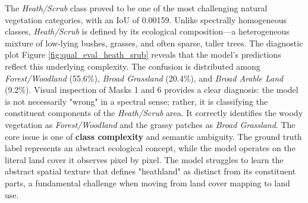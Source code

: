 \documentclass{report}
\begin{document}
\par
The \textit{Heath/Scrub} class proved to be one of the most challenging natural vegetation categories, with an IoU of 0.00159. Unlike spectrally homogeneous classes, \textit{Heath/Scrub} is defined by its ecological composition—a heterogeneous mixture of low-lying bushes, grasses, and often sparse, taller trees.
The diagnostic plot Figure \ref{fig:qual_eval_heath_srub} reveals that the model's predictions reflect this underlying complexity. The confusion is distributed among \textit{Forest/Woodland} (55.6\%), \textit{Broad Grassland} (20.4\%), and \textit{Broad Arable Land} (9.2\%). Visual inspection of Masks 1 and 6 provides a clear diagnosis: the model is not necessarily "wrong" in a spectral sense; rather, it is classifying the constituent components of the \textit{Heath/Scrub} area. It correctly identifies the woody vegetation as \textit{Forest/Woodland} and the grassy patches as \textit{Broad Grassland}. The core issue is one of \textbf{class complexity} and semantic ambiguity. The ground truth label represents an abstract ecological concept, while the model operates on the literal land cover it observes pixel by pixel. The model struggles to learn the abstract spatial texture that defines "heathland" as distinct from its constituent parts, a fundamental challenge when moving from land cover mapping to land use. \par
\end{document}
